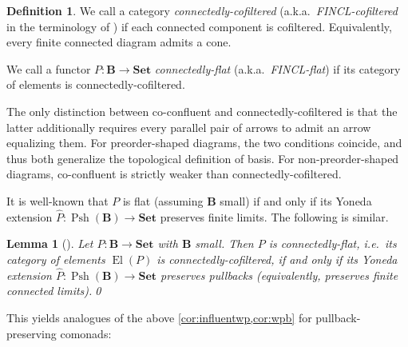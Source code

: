 \documentclass[11pt, oneside, article]{memoir}
\theoremstyle{plain}
\newtheorem{lemma}[theorem]{Lemma}
\theoremstyle{definition}
\newtheorem{definition}[def]{Definition}
\theoremstyle{remark}
\DeclareMathOperator{\Psh}{Psh}
\DeclareMathOperator{\El}{El}
\newcommand{\bang}{\mathrm{!}}
\newcommand{\namedcat}[1]{\mathbf{#1}}
\newcommand{\cat}[1]{\mathbf{#1}}
\newcommand{\Set}{\namedcat{Set}}
\newcommand{\ptlift}[1]{\overline{#1}}
\newcommand{\extend}[1]{\widehat{#1}}
\newcommand{\slicel}{\Sigma_\bang}
\newcommand{\ph}[1]{#1}
\newcommand{\Ps}[1]{\Psh(#1)}
\newcommand{\xX}{X}
\newcommand{\bB}{\cat{B}}
\newcommand{\pP}{\ph{P}}
\begin{document}
\begin{definition}\label{def:ionadbasis}
  We call a category \emph{connectedly-cofiltered} (a.k.a.\
  \emph{FINCL-cofiltered} in the terminology of
  \cite{adamek-borceux-lack-rosicky}) if each connected component is
  cofiltered. Equivalently, every finite connected diagram admits a
  cone.

  We call a functor $\pP \colon \bB \to \Set$ \emph{connectedly-flat}
  (a.k.a.\ \emph{FINCL-flat}) if its category of elements is
  connectedly-cofiltered.
\end{definition}

The only distinction between co-confluent and connectedly-cofiltered
is that the latter additionally requires every parallel pair of arrows
to admit an arrow equalizing them. For preorder-shaped diagrams, the
two conditions coincide, and thus both generalize the topological
definition of basis. For non-preorder-shaped diagrams, co-confluent is
strictly weaker than connectedly-cofiltered.

It is well-known that $\pP$ is flat (assuming $\bB$ small) if and only
if its Yoneda extension $\extend{\pP} \colon \Ps{\bB} \to \Set$
preserves finite limits. The following is similar.

\begin{lemma}[{\cite{adamek-borceux-lack-rosicky}}]\label{lem:connectedly}
  Let $\pP \colon \bB \to \Set$ with $\bB$ small. Then $\pP$ is
  connectedly-flat, i.e.\ its category of elements $\El(\pP)$ is
  connectedly-cofiltered, if and only if its Yoneda extension
  $\extend{\pP} \colon \Ps{\bB} \to \Set$ preserves pullbacks
  (equivalently, preserves finite connected limits).\qed
\end{lemma}

This yields analogues of the above \cref{cor:influentwp,cor:wpb} for
pullback-preserving comonads:
\end{document}
